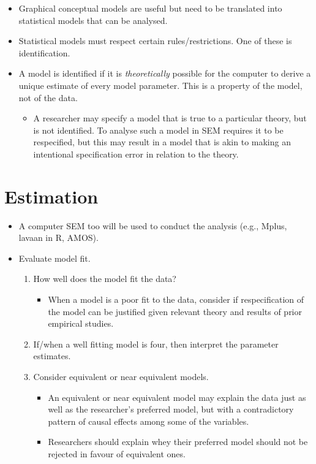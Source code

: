 \documentclass[]{book}
\providecommand{\tightlist}{%
  \setlength{\itemsep}{0pt}\setlength{\parskip}{0pt}}
\begin{document}
\begin{itemize}
\tightlist
\item
  Graphical conceptual models are useful but need to be translated into statistical models that can be analysed.
\item
  Statistical models must respect certain rules/restrictions. One of these is identification.
\item
  A model is identified if it is \emph{theoretically} possible for the computer to derive a unique estimate of every model parameter. This is a property of the model, not of the data.

  \begin{itemize}
  \tightlist
  \item
    A researcher may specify a model that is true to a particular theory, but is not identified. To analyse such a model in SEM requires it to be respecified, but this may result in a model that is akin to making an intentional specification error in relation to the theory.
  \end{itemize}
\end{itemize}

\hypertarget{estimation}{%
\section{Estimation}\label{estimation}}

\begin{itemize}
\item
  A computer SEM too will be used to conduct the analysis (e.g., Mplus, lavaan in R, AMOS).
\item
  Evaluate model fit.

  \begin{enumerate}
  \def\labelenumi{\arabic{enumi}.}
  \tightlist
  \item
    How well does the model fit the data?

    \begin{itemize}
    \tightlist
    \item
      When a model is a poor fit to the data, consider if respecification of the model can be justified given relevant theory and results of prior empirical studies.
    \end{itemize}
  \item
    If/when a well fitting model is four, then interpret the parameter estimates.
  \item
    Consider equivalent or near equivalent models.

    \begin{itemize}
    \tightlist
    \item
      An equivalent or near equivalent model may explain the data just as well as the researcher's preferred model, but with a contradictory pattern of causal effects among some of the variables.
    \item
      Researchers should explain whey their preferred model should not be rejected in favour of equivalent ones.
    \end{itemize}
  \end{enumerate}
\end{itemize}
\end{document}
